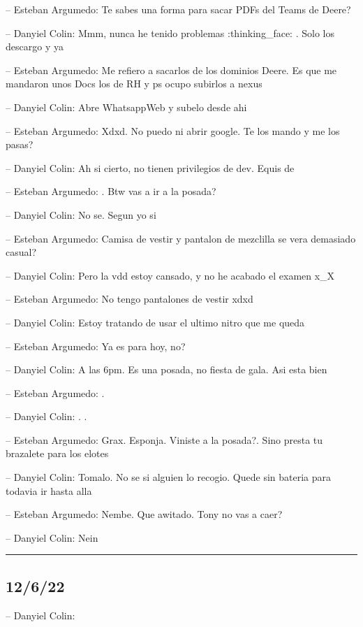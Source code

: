 -- Esteban Argumedo: Te sabes una forma para sacar PDFs del Teams de
Deere?

-- Danyiel Colin: Mmm, nunca he tenido problemas :thinking\_face: . Solo
los descargo y ya

-- Esteban Argumedo: Me refiero a sacarlos de los dominios Deere. Es que
me mandaron unos Docs los de RH y ps ocupo subirlos a nexus

-- Danyiel Colin: Abre WhatsappWeb y subelo desde ahi

-- Esteban Argumedo: Xdxd. No puedo ni abrir google. Te los mando y me
los pasas?

-- Danyiel Colin: Ah si cierto, no tienen privilegios de dev. Equis de

-- Esteban Argumedo: . Btw vas a ir a la posada?

-- Danyiel Colin: No se. Segun yo si

-- Esteban Argumedo: Camisa de vestir y pantalon de mezclilla se vera
demasiado casual?

-- Danyiel Colin: Pero la vdd estoy cansado, y no he acabado el examen
x\_X

-- Esteban Argumedo: No tengo pantalones de vestir xdxd

-- Danyiel Colin: Estoy tratando de usar el ultimo nitro que me queda

-- Esteban Argumedo: Ya es para hoy, no?

-- Danyiel Colin: A las 6pm. Es una posada, no fiesta de gala. Asi esta
bien

-- Esteban Argumedo: .

-- Danyiel Colin: . .

-- Esteban Argumedo: Grax. Esponja. Viniste a la posada?. Sino presta tu
brazalete para los elotes

-- Danyiel Colin: Tomalo. No se si alguien lo recogio. Quede sin bateria
para todavia ir hasta alla

-- Esteban Argumedo: Nembe. Que awitado. Tony no vas a caer?

-- Danyiel Colin: Nein

\begin{center}\rule{0.5\linewidth}{0.5pt}\end{center}

\hypertarget{section-169}{%
\subsection{12/6/22}\label{section-169}}

-- Danyiel Colin:

